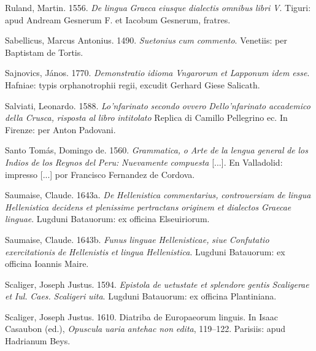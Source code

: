 Ruland, Martin. 1556. \textit{De} \textit{lingua} \textit{Graeca} \textit{eiusque} \textit{dialectis} \textit{omnibus} \textit{libri} \textit{V}. Tiguri: apud Andream Gesnerum F. et Iacobum Gesnerum, fratres.

Sabellicus, Marcus Antonius. 1490. \textit{Suetonius} \textit{cum} \textit{commento}. Venetiis: per Baptistam de Tortis.

Sajnovics, János. 1770. \textit{Demonstratio} \textit{idioma} \textit{Vngarorum} \textit{et} \textit{Lapponum} \textit{idem} \textit{esse}. Hafniae: typis orphanotrophii regii, excudit Gerhard Giese Salicath.

Salviati, Leonardo. 1588. \textit{Lo’nfarinato} \textit{secondo} \textit{ovvero} \textit{Dello’nfarinato} \textit{accademico} \textit{della} \textit{Crusca,} \textit{risposta} \textit{al} \textit{libro} \textit{intitolato} Replica di Camillo Pellegrino ec. In Firenze: per Anton Padovani.

Santo Tomás, Domingo de. 1560. \textit{Grammatica,} \textit{o} \textit{Arte} \textit{de} \textit{la} \textit{lengua} \textit{general} \textit{de} \textit{los} \textit{Indios} \textit{de} \textit{los} \textit{Reynos} \textit{del} \textit{Peru:} \textit{Nuevamente} \textit{compuesta} [...]. En Valladolid: impresso [...] por Francisco Fernandez de Cordova.

Saumaise, Claude. 1643a. \textit{De} \textit{Hellenistica} \textit{commentarius,} \textit{controuersiam} \textit{de} \textit{lingua} \textit{Hellenistica} \textit{decidens} \textit{et} \textit{plenissime} \textit{pertractans} \textit{originem} \textit{et} \textit{dialectos} \textit{Graecae} \textit{linguae}. Lugduni Batauorum: ex officina Elseuiriorum.

Saumaise, Claude. 1643b. \textit{Funus} \textit{linguae} \textit{Hellenisticae,} \textit{siue} \textit{Confutatio} \textit{exercitationis} \textit{de} \textit{Hellenistis} \textit{et} \textit{lingua} \textit{Hellenistica}. Lugduni Batauorum: ex officina Ioannis Maire.

Scaliger, Joseph Justus. 1594. \textit{Epistola} \textit{de} \textit{uetustate} \textit{et} \textit{splendore} \textit{gentis} \textit{Scaligerae} \textit{et} \textit{Iul.} \textit{Caes.} \textit{Scaligeri} \textit{uita}. Lugduni Batauorum: ex officina Plantiniana.

Scaliger, Joseph Justus. 1610. Diatriba de Europaeorum linguis. In Isaac Casaubon (ed.), \textit{Opuscula} \textit{uaria} \textit{antehac} \textit{non} \textit{edita}, 119–122. Parisiis: apud Hadrianum Beys.

